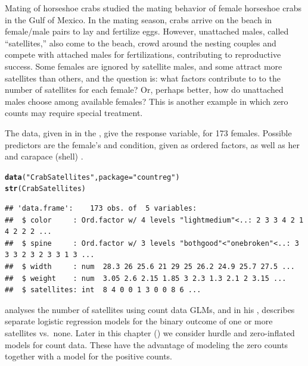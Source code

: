 \documentclass[11pt]{book}\usepackage[]{graphicx}\usepackage[]{color}
\makeatletter
\newcommand{\hlstr}[1]{\textcolor[rgb]{0.192,0.494,0.8}{#1}}%
\newcommand{\hlstd}[1]{\textcolor[rgb]{0.345,0.345,0.345}{#1}}%
\newcommand{\hlkwc}[1]{\textcolor[rgb]{0.333,0.667,0.333}{#1}}%
\newcommand{\hlkwd}[1]{\textcolor[rgb]{0.737,0.353,0.396}{\textbf{#1}}}%
\newenvironment{kframe}{%
 \def\at@end@of@kframe{}%
 \ifinner\ifhmode%
  \def\at@end@of@kframe{\end{minipage}}%
  \begin{minipage}{\columnwidth}%
 \fi\fi%
 \def\FrameCommand##1{\hskip\@totalleftmargin \hskip-\fboxsep
 \colorbox{shadecolor}{##1}\hskip-\fboxsep
     \hskip-\linewidth \hskip-\@totalleftmargin \hskip\columnwidth}%
 \MakeFramed {\advance\hsize-\width
   \@totalleftmargin\z@ \linewidth\hsize
   \@setminipage}}%
 {\par\unskip\endMakeFramed%
 \at@end@of@kframe}
\newenvironment{knitrout}{}{} %
\renewenvironment{knitrout}{\small\renewcommand{\baselinestretch}{.85}}{} %
\makeatother
\begin{document}
\begin{Example}[crabs1]{Mating of horseshoe crabs}
\citet{Brockmann:1996} studied the mating behavior of female horseshoe crabs in the Gulf of Mexico.
In the mating season, crabs arrive on the beach in female/male pairs to lay and fertilize eggs.
However, unattached males, called ``satellites,''
also come to the beach, crowd around the nesting couples and compete with attached males for fertilizations,
contributing to reproductive success.
Some females are ignored by satellite males, and some attract
more satellites than others, and the question is: what factors contribute to
to the number of satellites for each female? Or, perhaps better, how do unattached males choose among
available females?
This is another example in which zero counts
may require special treatment.

The data, given in  in the , give the 
response variable,  for 173 females.  Possible predictors
are the female's  and  condition, given as ordered factors,
as well as her  and carapace (shell) .

\begin{knitrout}\footnotesize
{}\color{fgcolor}\begin{kframe}
\begin{alltt}
\hlkwd{data}\hlstd{(}\hlstr{"CrabSatellites"}\hlstd{,} \hlkwc{package} \hlstd{=} \hlstr{"countreg"}\hlstd{)}
\hlkwd{str}\hlstd{(CrabSatellites)}
\end{alltt}
\begin{verbatim}
## 'data.frame':	173 obs. of  5 variables:
##  $ color     : Ord.factor w/ 4 levels "lightmedium"<..: 2 3 3 4 2 1 4 2 2 2 ...
##  $ spine     : Ord.factor w/ 3 levels "bothgood"<"onebroken"<..: 3 3 3 2 3 2 3 3 1 3 ...
##  $ width     : num  28.3 26 25.6 21 29 25 26.2 24.9 25.7 27.5 ...
##  $ weight    : num  3.05 2.6 2.15 1.85 3 2.3 1.3 2.1 2 3.15 ...
##  $ satellites: int  8 4 0 0 1 3 0 0 8 6 ...
\end{verbatim}
\end{kframe}
\end{knitrout}

\citet[\S 4.3]{Agresti:2013} analyses the number of satellites using count data
GLMs, and in his , describes separate logistic regression models for the binary
outcome of one or more satellites vs.\ none.  Later in this chapter ()
we consider
hurdle and zero-inflated models for count data.  These have the advantage of 
modeling the zero counts together with a model for the positive counts.


\end{Example}
\end{document}
